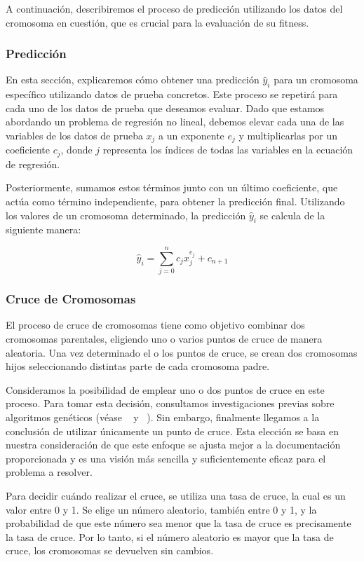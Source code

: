 \documentclass[conference,a4paper]{IEEEtran}
\begin{document}
A continuación, describiremos el proceso de predicción utilizando los datos del cromosoma en cuestión, que es crucial para la evaluación de su fitness.

\subsubsection{Predicción}
En esta sección, explicaremos cómo obtener una predicción \(\hat{y}_i\) para un cromosoma específico utilizando datos de prueba concretos. Este proceso se repetirá para cada uno de los datos de prueba que deseamos evaluar. Dado que estamos abordando un problema de regresión no lineal, debemos elevar cada una de las variables de los datos de prueba \(x_j\) a un exponente \(e_j\) y multiplicarlas por un coeficiente \(c_j\), donde \(j\) representa los índices de todas las variables en la ecuación de regresión. 

Posteriormente, sumamos estos términos junto con un último coeficiente, que actúa como término independiente, para obtener la predicción final. Utilizando los valores de un cromosoma determinado, la predicción \(\hat{y}_i\) se calcula de la siguiente manera:

\[
\hat{y}_i = \sum_{j=0}^{n} c_j x_j^{e_j} + c_{n+1}
\]


\subsubsection{Cruce de Cromosomas}
El proceso de cruce de cromosomas tiene como objetivo combinar dos cromosomas parentales, eligiendo uno o varios puntos de cruce de manera aleatoria. Una vez determinado el o los puntos de cruce, se crean dos cromosomas hijos seleccionando distintas parte de cada cromosoma padre. 

Consideramos la posibilidad de emplear uno o dos puntos de cruce en este proceso. Para tomar esta decisión, consultamos investigaciones previas sobre algoritmos genéticos (véase ~\cite{b1} y ~\cite{b2}). Sin embargo, finalmente llegamos a la conclusión de utilizar únicamente un punto de cruce. Esta elección se basa en nuestra consideración de que este enfoque se ajusta mejor a la documentación proporcionada y es una visión más sencilla y suficientemente eficaz para el problema a resolver.

Para decidir cuándo realizar el cruce, se utiliza una tasa de cruce, la cual es un valor entre 0 y 1. Se elige un número aleatorio, también entre 0 y 1, y la probabilidad de que este número sea menor que la tasa de cruce es precisamente la tasa de cruce. Por lo tanto, si el número aleatorio es mayor que la tasa de cruce, los cromosomas se devuelven sin cambios. 
\end{document}
